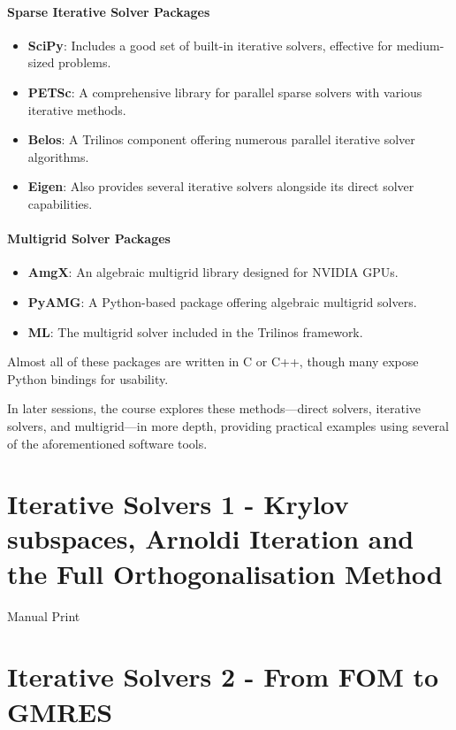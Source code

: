 \documentclass[11pt,a4paper]{book}
\begin{document}
\subsubsection*{Sparse Iterative Solver Packages}
\begin{itemize}
  \item \textbf{SciPy}: Includes a good set of built-in iterative solvers, effective for medium-sized problems.
  \item \textbf{PETSc}: A comprehensive library for parallel sparse solvers with various iterative methods.
  \item \textbf{Belos}: A Trilinos component offering numerous parallel iterative solver algorithms.
  \item \textbf{Eigen}: Also provides several iterative solvers alongside its direct solver capabilities.
\end{itemize}

\subsubsection*{Multigrid Solver Packages}
\begin{itemize}
  \item \textbf{AmgX}: An algebraic multigrid library designed for NVIDIA GPUs.
  \item \textbf{PyAMG}: A Python-based package offering algebraic multigrid solvers.
  \item \textbf{ML}: The multigrid solver included in the Trilinos framework.
\end{itemize}

Almost all of these packages are written in C or C++, though many expose Python bindings for usability.

In later sessions, the course explores these methods—direct solvers, iterative solvers, and multigrid—in more depth, providing practical examples using several of the aforementioned software tools.

\chapter{Iterative Solvers 1 - Krylov subspaces, Arnoldi Iteration and the Full Orthogonalisation Method}

Manual Print

\chapter{Iterative Solvers 2 - From FOM to GMRES}
\end{document}
